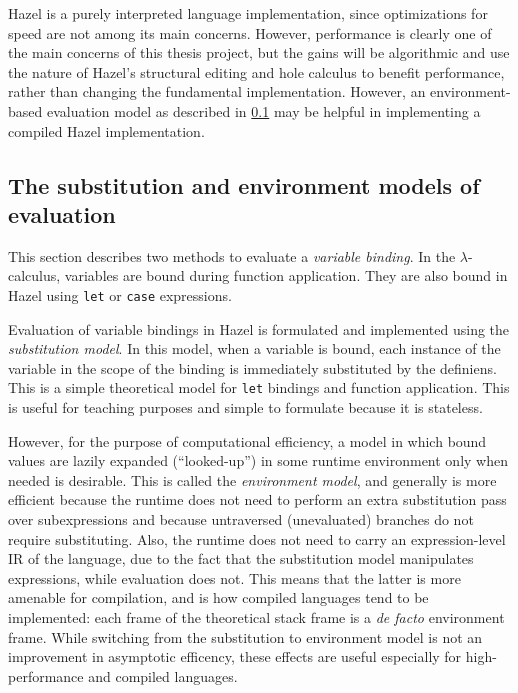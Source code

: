 Hazel is a purely interpreted language implementation, since optimizations for speed are not among its main concerns. However, performance is clearly one of the main concerns of this thesis project, but the gains will be algorithmic and use the nature of Hazel's structural editing and hole calculus to benefit performance, rather than changing the fundamental implementation. However, an environment-based evaluation model as described in \cref{sec:sub-vs-eval} may be helpful in implementing a compiled Hazel implementation.

\subsection{The substitution and environment models of evaluation}
\label{sec:sub-vs-eval}

This section describes two methods to evaluate a \textit{variable binding}. In the $\lambda$-calculus, variables are bound during function application. They are also bound in Hazel using \texttt{let} or \texttt{case} expressions.

Evaluation of variable bindings in Hazel is formulated and implemented using the \textit{substitution model}. In this model, when a variable is bound, each instance of the variable in the scope of the binding is immediately substituted by the definiens. This is a simple theoretical model for \texttt{let} bindings and function application. This is useful for teaching purposes and simple to formulate because it is stateless.

However, for the purpose of computational efficiency, a model in which bound values are lazily expanded (``looked-up'') in some runtime environment only when needed is desirable. This is called the \textit{environment model}, and generally is more efficient because the runtime does not need to perform an extra substitution pass over subexpressions and because untraversed (unevaluated) branches do not require substituting. Also, the runtime does not need to carry an expression-level IR of the language, due to the fact that the substitution model manipulates expressions, while evaluation does not. This means that the latter is more amenable for compilation, and is how compiled languages tend to be implemented: each frame of the theoretical stack frame is a \textit{de facto} environment frame. While switching from the substitution to environment model is not an improvement in asymptotic efficency, these effects are useful especially for high-performance and compiled languages.

